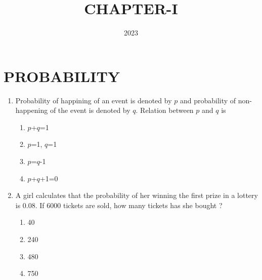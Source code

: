 \documentclass{article}
\newcommand{\one}{1}
\begin{document}
    
\title{CHAPTER-I}
\date{2023}
\maketitle
\LARGE
\section{PROBABILITY}
\begin{enumerate}[\one.1]
	\item Probability of happining of an event is denoted by $p$ and probability of non-happening of the event is denoted by $q$. Relation between $p$ and $q$ is
                        \begin{enumerate}
                                \item $p$+$q$=1
                                \item $p$=1, $q$=1
                                \item $p$=$q$-1
                                \item $p$+$q$+1=0
                        \end{enumerate}
			
        \item A girl calculates that the probability of her winning the first prize in a lottery is 0.08. If 6000 tickets are sold, how many tickets has she bought ?
                        \begin{enumerate}
                                \item  40
                                \item  240
                                \item  480
                                \item  750


\end{enumerate}
\end{enumerate}
\end{document}

